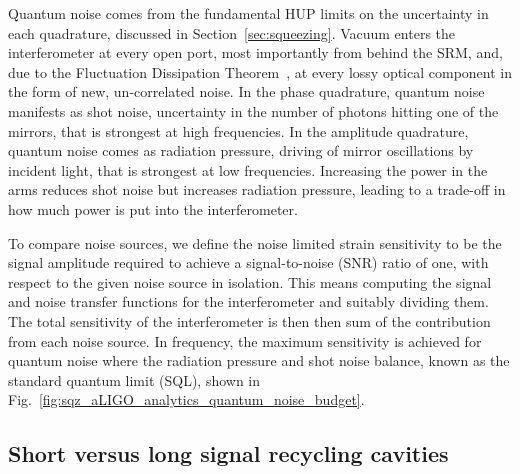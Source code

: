 \documentclass[aps,pra,superscriptaddress,reprint,nofootinbib]{revtex4-1}
\begin{document}
Quantum noise comes from the fundamental HUP limits on the uncertainty in each quadrature, discussed in Section~\ref{sec:squeezing}. Vacuum enters the interferometer at every open port, most importantly from behind the SRM, and, due to the Fluctuation Dissipation Theorem~\cite{Danilishin_2012}, at every lossy optical component in the form of new, un-correlated noise. In the phase quadrature, quantum noise manifests as shot noise, uncertainty in the number of photons hitting one of the mirrors, that is strongest at high frequencies. In the amplitude quadrature, quantum noise comes as radiation pressure, driving of mirror oscillations by incident light, that is strongest at low frequencies. Increasing the power in the arms reduces shot noise but increases radiation pressure, leading to a trade-off in how much power is put into the interferometer.


To compare noise sources, we define the noise limited strain sensitivity to be the signal amplitude required to achieve a signal-to-noise (SNR) ratio of one, with respect to the given noise source in isolation. This means computing the signal and noise transfer functions for the interferometer and suitably dividing them. The total sensitivity of the interferometer is then then sum of the contribution from each noise source.
In frequency, the maximum sensitivity is achieved for quantum noise where the radiation pressure and shot noise balance, known as the standard quantum limit (SQL), shown in Fig.~\ref{fig:sqz_aLIGO_analytics_quantum_noise_budget}.	


\subsection{Short versus long signal recycling cavities}
\label{sec:long_srcs}
\end{document}
